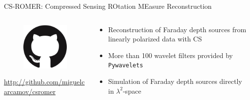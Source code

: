 \documentclass[xetex,aspectratio=169]{beamer}
\begin{document}
    \begin{frame}{CS-ROMER: Compressed Sensing ROtation MEasure Reconstruction}
        \begin{columns}[onlytextwidth,t]
        \begin{column}{.5\textwidth}
            \begin{figure}
                \centering
                \includegraphics[scale=0.5]{figures/logos/GitHub-Mark-120px-plus.png}
            \end{figure}
            
            \url{http://github.com/miguelcarcamov/csromer}
        \end{column}
    \begin{column}{.5\textwidth}
        \begin{itemize}
            \item Reconstruction of Faraday depth sources from linearly polarized data with CS
            \item More than 100 wavelet filters provided by {\tt Pywavelets}
            \item Simulation of Faraday depth sources directly in $\lambda^2$-space
  
        \end{itemize}
    \end{column}%
    
    \end{columns}
    \end{frame}
    
\end{document}
